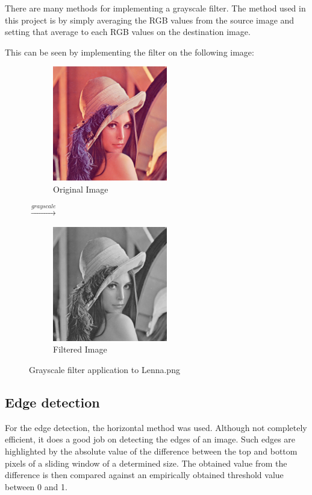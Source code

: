 \documentclass[a4paper,12pt]{article}
\begin{document}
	There are many methods for implementing a grayscale filter. The method used in this project is by simply averaging the RGB values from the source image and setting that average to each RGB values on the destination image.
	
	This can be seen by implementing the filter on the following image: 
	
	\vfill	
	
	\begin{figure}[h]
		\centering
		\begin{subfigure}{.47\textwidth}
			\centering
			\includegraphics[width=5cm]{Lenna.png}
			\caption{Original Image}
		\end{subfigure}%
		{\LARGE$\xrightarrow{grayscale}$}%
		\begin{subfigure}{.47\textwidth}
			\centering
			\includegraphics[width=5cm]{jv_gray_Lenna.png}
			\caption{Filtered Image}
		\end{subfigure}

		\caption{Grayscale filter application to Lenna.png}
	\end{figure}		
		
	
	\subsection{Edge detection}
	
	For the edge detection, the horizontal method was used. Although not completely efficient, it does a good job on detecting the edges of an image. Such edges are highlighted by the absolute value of the difference between the top and bottom pixels of a sliding window of a determined size. The obtained value from the difference is then compared against an empirically obtained threshold value between 0 and 1.\\ 
\end{document}
